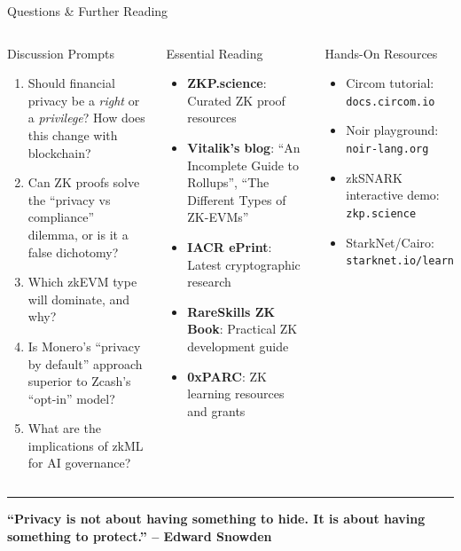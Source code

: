 \documentclass[8pt,aspectratio=169]{beamer}
\newcommand{\bottomnote}[1]{\vfill\vspace{-2mm}\textcolor{mllavender2}{\rule{\textwidth}{0.4pt}}\vspace{1mm}\footnotesize\textbf{#1}}
\begin{document}
\begin{frame}{Questions \& Further Reading}
\begin{columns}[T]
\begin{block}{\footnotesize Discussion Prompts}
\footnotesize
\begin{enumerate}
\item Should financial privacy be a \emph{right} or a \emph{privilege}? How does this change with blockchain?
\item Can ZK proofs solve the ``privacy vs compliance'' dilemma, or is it a false dichotomy?
\item Which zkEVM type will dominate, and why?
\item Is Monero's ``privacy by default'' approach superior to Zcash's ``opt-in'' model?
\item What are the implications of zkML for AI governance?
\end{enumerate}
\end{block}
\begin{block}{\footnotesize Essential Reading}
\footnotesize
\begin{itemize}
\item \textbf{ZKP.science}: Curated ZK proof resources
\item \textbf{Vitalik's blog}: ``An Incomplete Guide to Rollups'', ``The Different Types of ZK-EVMs''
\item \textbf{IACR ePrint}: Latest cryptographic research
\item \textbf{RareSkills ZK Book}: Practical ZK development guide
\item \textbf{0xPARC}: ZK learning resources and grants
\end{itemize}
\end{block}
\vspace{0.1cm}
\begin{exampleblock}{\footnotesize Hands-On Resources}
\footnotesize
\begin{itemize}
\item Circom tutorial: \texttt{docs.circom.io}
\item Noir playground: \texttt{noir-lang.org}
\item zkSNARK interactive demo: \texttt{zkp.science}
\item StarkNet/Cairo: \texttt{starknet.io/learn}
\end{itemize}
\end{exampleblock}
\end{columns}
\bottomnote{``Privacy is not about having something to hide. It is about having something to protect.'' -- Edward Snowden}
\end{frame}
\end{document}
